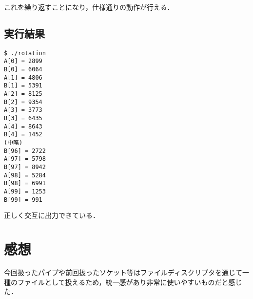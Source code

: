 \documentclass[a4j,10pt,titlepage]{jsarticle}
\begin{document}
これを繰り返すことになり，仕様通りの動作が行える．

\subsection{実行結果}
\begin{verbatim}
$ ./rotation 
A[0] = 2899
B[0] = 6064
A[1] = 4806
B[1] = 5391
A[2] = 8125
B[2] = 9354
A[3] = 3773
B[3] = 6435
A[4] = 8643
B[4] = 1452
(中略)
B[96] = 2722
A[97] = 5798
B[97] = 8942
A[98] = 5284
B[98] = 6991
A[99] = 1253
B[99] = 991
\end{verbatim}

正しく交互に出力できている．

\section{感想}
今回扱ったパイプや前回扱ったソケット等はファイルディスクリプタを通じて一種のファイルとして扱えるため，統一感があり非常に使いやすいものだと感じた．
\end{document}
